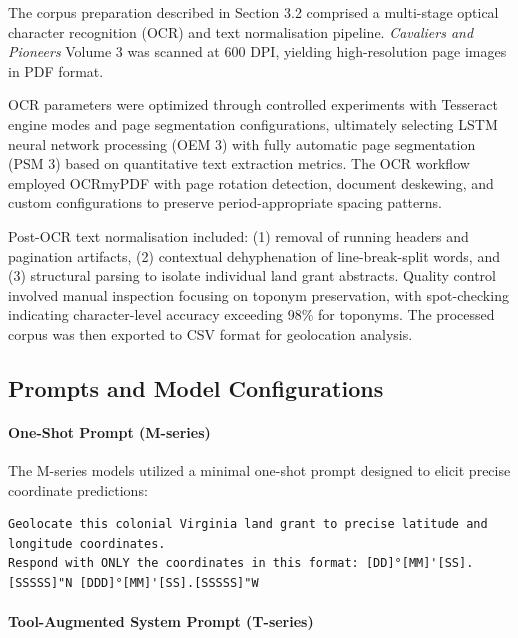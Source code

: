 The corpus preparation described in Section 3.2 comprised a multi-stage
optical character recognition (OCR) and text normalisation pipeline.
\emph{Cavaliers and Pioneers} Volume 3 was scanned at 600 DPI, yielding
high-resolution page images in PDF format.

OCR parameters were optimized through controlled experiments with
Tesseract engine modes and page segmentation configurations, ultimately
selecting LSTM neural network processing (OEM 3) with fully automatic
page segmentation (PSM 3) based on quantitative text extraction metrics.
The OCR workflow employed OCRmyPDF with page rotation detection,
document deskewing, and custom configurations to preserve
period-appropriate spacing patterns.

Post-OCR text normalisation included: (1) removal of running headers and
pagination artifacts, (2) contextual dehyphenation of line-break-split
words, and (3) structural parsing to isolate individual land grant
abstracts. Quality control involved manual inspection focusing on
toponym preservation, with spot-checking indicating character-level
accuracy exceeding 98\% for toponyms. The processed corpus was then
exported to CSV format for geolocation analysis.

\subsection{Prompts and Model Configurations}\label{sec:prompts}

\paragraph{One-Shot Prompt
(M-series)}\label{a.2.1-one-shot-prompt-m-series}

The M-series models utilized a minimal one-shot prompt designed to
elicit precise coordinate predictions:

\begin{lstlisting}
Geolocate this colonial Virginia land grant to precise latitude and longitude coordinates.
Respond with ONLY the coordinates in this format: [DD]°[MM]'[SS].[SSSSS]"N [DDD]°[MM]'[SS].[SSSSS]"W
\end{lstlisting}

\paragraph{Tool-Augmented System Prompt
(T-series)}\label{a.2.2-tool-augmented-system-prompt-t-series}

